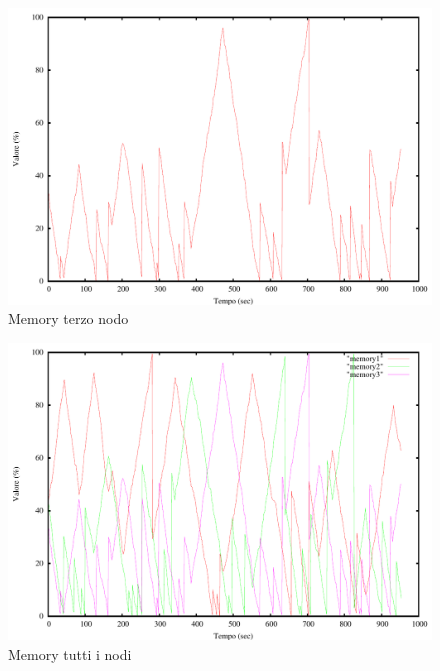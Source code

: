 \begin{figure}[H]
\begin{center}
\includegraphics[scale=0.6]{etc/memory3.pdf}
\caption{Memory terzo nodo}
\label{fig:memory3}
\end{center}
\end{figure}
\begin{figure}[H]
\begin{center}
\includegraphics[scale=0.6]{etc/memory.pdf}
\caption{Memory tutti i nodi}
\label{fig:memory}
\end{center}
\end{figure}

